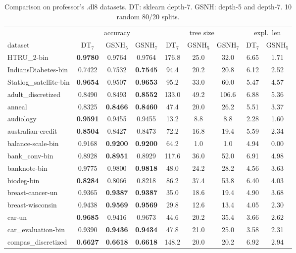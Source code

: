 \begin{table}[htbp]
\centering\small
\caption{Comparison on professor's .dl8 datasets. DT: sklearn depth-7. GSNH: depth-5 and depth-7. 10 random 80/20 splits.}
\begin{tabular}{l|ccc|ccc|cc}
\toprule
 & \multicolumn{3}{c|}{accuracy} & \multicolumn{3}{c|}{tree size} & \multicolumn{2}{c}{expl.\ len} \\
dataset & DT$_7$ & GSNH$_5$ & GSNH$_7$ & DT$_7$ & GSNH$_5$ & GSNH$_7$ & DT$_7$ & GSNH$_5$ \\
\midrule
HTRU\_2-bin & \textbf{0.9780} & 0.9764 & 0.9764 & 176.8 & 25.0 & 32.0 & 6.65 & 1.71 \\
IndiansDiabetes-bin & 0.7422 & 0.7532 & \textbf{0.7545} & 94.4 & 20.2 & 20.8 & 6.12 & 2.52 \\
Statlog\_satellite-bin & \textbf{0.9654} & 0.9507 & \textbf{0.9653} & 95.2 & 33.0 & 60.0 & 5.47 & 4.57 \\
adult\_discretized & 0.8490 & 0.8493 & \textbf{0.8552} & 133.0 & 49.2 & 106.6 & 6.88 & 5.36 \\
anneal & 0.8325 & \textbf{0.8466} & \textbf{0.8460} & 47.4 & 20.0 & 26.2 & 5.51 & 3.37 \\
audiology & \textbf{0.9591} & 0.9455 & 0.9455 & 13.2 & 8.8 & 8.8 & 2.28 & 1.60 \\
australian-credit & \textbf{0.8504} & 0.8427 & 0.8473 & 72.2 & 16.8 & 19.4 & 5.59 & 2.34 \\
balance-scale-bin & 0.9168 & \textbf{0.9200} & \textbf{0.9200} & 64.2 & 1.0 & 1.0 & 4.94 & 0.00 \\
bank\_conv-bin & 0.8928 & \textbf{0.8951} & 0.8929 & 117.6 & 36.0 & 52.0 & 6.91 & 4.98 \\
banknote-bin & 0.9775 & 0.9800 & \textbf{0.9818} & 48.0 & 24.2 & 28.2 & 4.56 & 3.63 \\
biodeg-bin & \textbf{0.8284} & 0.8066 & 0.8218 & 86.2 & 37.4 & 53.8 & 6.40 & 4.03 \\
breast-cancer-un & 0.9365 & \textbf{0.9387} & \textbf{0.9387} & 35.0 & 18.6 & 19.4 & 4.90 & 3.68 \\
breast-wisconsin & 0.9438 & \textbf{0.9569} & \textbf{0.9569} & 29.8 & 12.6 & 13.4 & 4.05 & 2.30 \\
car-un & \textbf{0.9685} & 0.9416 & 0.9673 & 44.6 & 20.2 & 35.4 & 3.66 & 2.62 \\
car\_evaluation-bin & 0.9390 & \textbf{0.9436} & \textbf{0.9434} & 47.8 & 21.0 & 25.0 & 3.58 & 2.31 \\
compas\_discretized & \textbf{0.6627} & \textbf{0.6618} & \textbf{0.6618} & 148.2 & 20.0 & 20.2 & 6.92 & 2.94 \\

\end{tabular}
\end{table}
